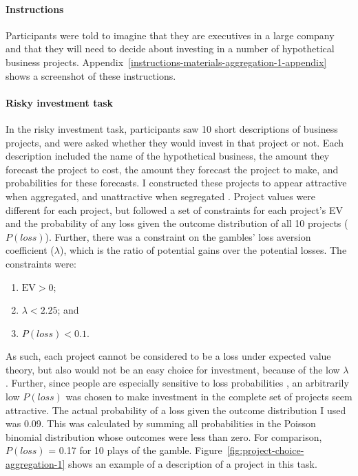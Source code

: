 \documentclass[a4paper, nobind, dvipsnames]{templates/ociamthesis}
\theoremstyle{definition}
\theoremstyle{definition}
\theoremstyle{definition}
\theoremstyle{definition}
\theoremstyle{remark}
\begin{document}
\hypertarget{instructions-materials-aggregation-1}{%
\paragraph{Instructions}\label{instructions-materials-aggregation-1}}

Participants were told to imagine that they are executives in a large company
and that they will need to decide about investing in a number of hypothetical
business projects. Appendix~\ref{instructions-materials-aggregation-1-appendix}
shows a screenshot of these instructions.

\hypertarget{task-aggregation-1}{%
\paragraph{Risky investment task}\label{task-aggregation-1}}

In the risky investment task, participants saw 10 short descriptions of business
projects, and were asked whether they would invest in that project or not. Each
description included the name of the hypothetical business, the amount they
forecast the project to cost, the amount they forecast the project to make, and
probabilities for these forecasts. I constructed these projects to appear
attractive when aggregated, and unattractive when segregated \autocite[see][]{langer2001}.
Project values were different for each project, but followed a set of
constraints for each project's EV and the probability of any loss given the
outcome distribution of all 10 projects (\(P(loss)\)). Further, there was a
constraint on the gambles' loss aversion coefficient (\(\lambda\)), which is the
ratio of potential gains over the potential losses. The constraints were:

\begin{enumerate}
\def\labelenumi{\arabic{enumi}.}
\item
  \(\text{EV} > 0\);
\item
  \(\lambda < 2.25\); and
\item
  \(P(loss) < 0.1\).
\end{enumerate}

As such, each project cannot be considered to be a loss under expected value
theory, but also would not be an easy choice for investment, because of the low
\(\lambda\) \autocite[made to be lower than the median loss aversion coefficient calculated
in][]{tversky1992}. Further, since people are especially sensitive to loss
probabilities \autocite{zeisberger2020,kahneman1979}, an arbitrarily low \(P(loss)\) was
chosen to make investment in the complete set of projects seem attractive. The
actual probability of a loss given the outcome distribution I used was
0.09. This was calculated by summing all
probabilities in the Poisson binomial distribution whose outcomes were less than
zero. For comparison, \(P(loss)\) =
0.17 for 10 plays of the \textcite{samuelson1963}
gamble. Figure~\ref{fig:project-choice-aggregation-1} shows an example of a
description of a project in this task.
\end{document}
